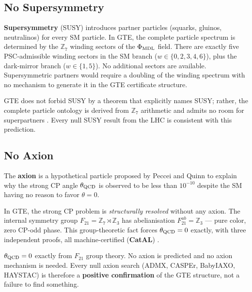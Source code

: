 \documentclass[11pt,a4paper]{article}
\newcommand{\term}[1]{\textbf{#1}}
\newcommand{\CatAL}{\textbf{CatAL}}
\begin{document}
\subsection{No Supersymmetry}

\term{Supersymmetry} (SUSY) introduces partner particles (squarks, gluinos,
neutralinos) for every SM particle.  In GTE, the complete particle spectrum is
determined by the $\mathbb{Z}_7$ winding sectors of the $\Phi_{\rm MDL}$ field.
There are exactly five PSC-admissible winding sectors in the SM branch
($w \in \{0,2,3,4,6\}$), plus the dark-mirror branch ($w \in \{1,5\}$).  No
additional sectors are available.  Supersymmetric partners would require a
doubling of the winding spectrum with no mechanism to generate it in the
GTE certificate structure.

GTE does not forbid SUSY by a theorem that explicitly names SUSY; rather, the
complete particle ontology is derived from $\mathbb{Z}_7$ arithmetic and admits
no room for superpartners \cite{SpivackGTECompleteFramework}.  Every null SUSY
result from the LHC is consistent with this prediction.

\subsection{No Axion}

The \term{axion} is a hypothetical particle proposed by Peccei and Quinn to
explain why the strong CP angle $\theta_{\rm QCD}$ is observed to be less than
$10^{-10}$ despite the SM having no reason to favor $\theta = 0$.

In GTE, the strong CP problem is \emph{structurally resolved} without any axion.
The internal symmetry group $F_{21} = \mathbb{Z}_7 \rtimes \mathbb{Z}_3$ has
abelianisation $F_{21}^{ab} = \mathbb{Z}_3$ — pure color, zero CP-odd phase.
This group-theoretic fact forces $\theta_{\rm QCD} = 0$ exactly, with three
independent proofs, all machine-certified (\CatAL)
\cite{SpivackGTECompleteFramework}.

\begin{tcolorbox}[colback=boxred,colframe=red!60!black,
  title={Strong CP Prediction (\CatAL, three independent proofs)}]
$\theta_{\rm QCD} = 0$ exactly from $F_{21}$ group theory.  No axion is
predicted and no axion mechanism is needed.  Every null axion search (ADMX,
CASPEr, BabyIAXO, HAYSTAC) is therefore a \textbf{positive confirmation} of
the GTE structure, not a failure to find something.
\end{tcolorbox}
\end{document}

